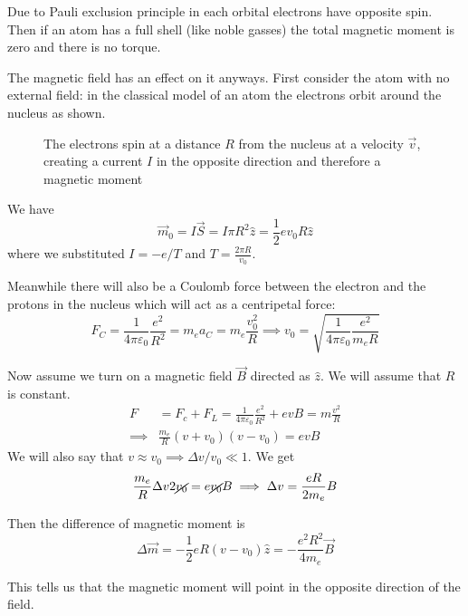 \documentclass[12pt]{extarticle}
\begin{document}
Due to Pauli exclusion principle in each orbital electrons have opposite spin.
Then if an atom has a full shell (like noble gasses) the total magnetic moment is zero and there is no torque.

The magnetic field has an effect on it anyways.
First consider the atom with no external field: in the classical model of an atom the electrons orbit around the nucleus
as shown.

\begin{figure}[H]
	\centering
	
	\caption{The electrons spin at a distance $R$ from the nucleus at a velocity $\vec v$,
		creating a current $I$ in the opposite direction and therefore a magnetic moment}
\end{figure}

We have
\begin{equation}
	\vec m_0 = I \vec S = I \pi R^2 \hat z = \frac{1}{2}e v_0 R \hat z
\end{equation}
where we substituted $I = -e/T$ and $T = \frac{2\pi R}{v_0}$.

Meanwhile there will also be a Coulomb force between the electron and the protons in the nucleus
which will act as a centripetal force:
\begin{equation}
	F_C = \frac{1}{4 \pi \varepsilon_0} \frac{e^2}{R^2} = m_e a_C = m_e \frac{v_0^2}{R}
	\implies v_0 = \sqrt{\frac{1}{4 \pi \varepsilon_0} \frac{e^2}{m_e R}}
\end{equation}

Now assume we turn on a magnetic field $\vec B$ directed as $\hat z$.
We will assume that $R$ is constant.
\begin{align}
	F        & = F_c + F_L = \frac{1}{4 \pi \varepsilon_0} \frac{e^2}{R^2} + e v B = m \frac{v^2}{R} \\
	\implies & \frac{m_e}{R} (v+v_0)(v- v_0) = evB
\end{align}
We will also say that $v \approx v_0 \implies \Delta v/v_0 \ll 1$.
We get
\begin{equation}
	\frac{m_e}{R}\Delta v 2 \cancel{v_0} = e \cancel{v_0} B \implies \Delta v = \frac{e R}{2m_e}B
\end{equation}

Then the difference of magnetic moment is
\begin{equation}
	\Delta \vec m = -\frac{1}{2} e R (v-v_0) \hat z = -\frac{e^2R^2}{4 m_e} \vec B
\end{equation}

This tells us that the magnetic moment will point in the opposite direction of the field.
\end{document}
